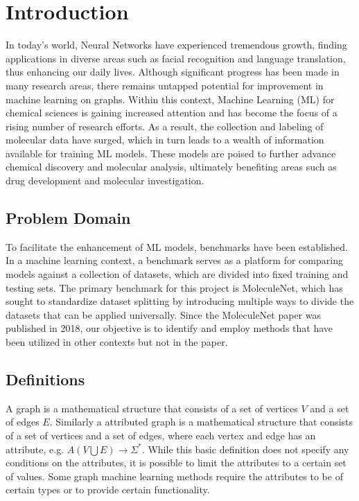 \section{Introduction}

In today's world, Neural Networks have experienced tremendous growth, finding applications in diverse areas such as facial recognition and language translation, thus enhancing our daily lives. Although significant progress has been made in many research areas, there remains untapped potential for improvement in machine learning on graphs. Within this context, Machine Learning (ML) for chemical sciences is gaining increased attention and has become the focus of a rising number of research efforts. As a result, the collection and labeling of molecular data have surged, which in turn leads to a wealth of information available for training ML models. These models are poised to further advance chemical discovery and molecular analysis, ultimately benefiting areas such as drug development and molecular investigation.

\subsection{Problem Domain}

To facilitate the enhancement of ML models, benchmarks have been established. In a machine learning context, a benchmark serves as a platform for comparing models against a collection of datasets, which are divided into fixed training and testing sets. The primary benchmark for this project is MoleculeNet, which has sought to standardize dataset splitting by introducing multiple ways to divide the datasets that can be applied universally. Since the MoleculeNet paper was published in 2018, our objective is to identify and employ methods that have been utilized in other contexts but not in the paper.

\subsection{Definitions}

A graph is a mathematical structure that consists of a set of vertices $V$ and a set of edges $E$.
Similarly a attributed graph is a mathematical structure that consists of a set of vertices and a set of edges, where each vertex and edge has an attribute, e.g. $A(V \bigcup E) \to \Sigma^*$.
While this basic definition does not specify any conditions on the attributes, it is possible to limit the attributes to a certain set of values.
Some graph machine learning methods require the attributes to be of certain types or to provide certain functionality.
